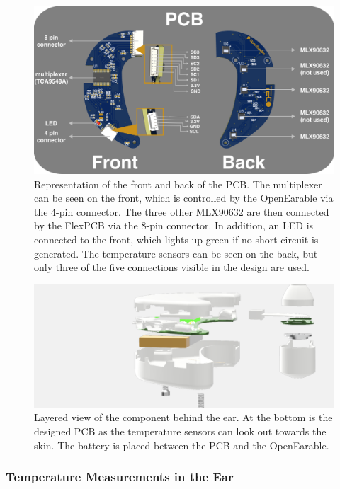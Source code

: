 \begin{figure}
    \centering
    \includegraphics[width=\textwidth]{thesis-doc/images/prototype/PCB_Description.png}
    \caption{Representation of the front and back of the PCB. The multiplexer can be seen on the front, which is controlled by the OpenEarable via the 4-pin connector. The three other MLX90632 are then connected by the FlexPCB via the 8-pin connector. In addition, an LED is connected to the front, which lights up green if no short circuit is generated. The temperature sensors can be seen on the back, but only three of the five connections visible in the design are used.}
    \label{fig:design:pcb_description}
\end{figure}

\begin{figure}
    \centering
    \includegraphics[width=\textwidth]{thesis-doc/images/prototype/Prototype_PCB_layered_view.png}
    \caption{Layered view of the component behind the ear. At the bottom is the designed PCB as the temperature sensors can look out towards the skin. The battery is placed between the PCB and the OpenEarable.}
    \label{fig:design:prototype_behind_head_layered_view}
\end{figure}

\subsubsection{Temperature Measurements in the Ear}
\label{ch:Design:Prototype:Earpiece}

